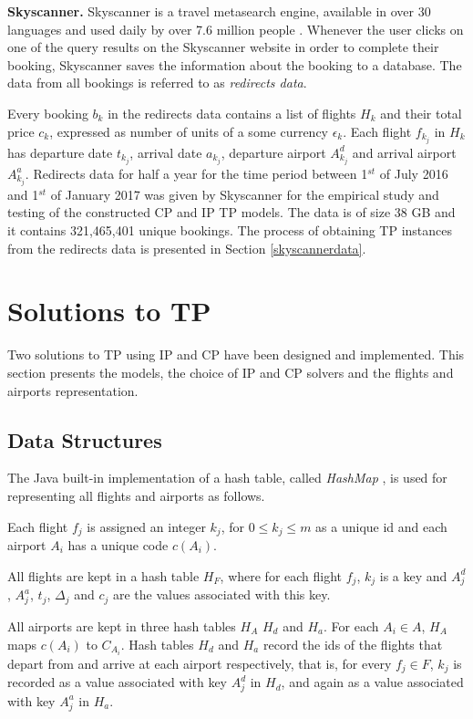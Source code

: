 \documentclass{mpaper}
\begin{document}
\textbf{Skyscanner.} Skyscanner \cite{skyscanner} is a travel metasearch engine, available in over 30 languages and used daily by over 7.6 million people \cite{skyscannerusage}. Whenever the user clicks on one of the query results on the Skyscanner website \cite{skyscanner} in order to complete their booking, Skyscanner saves the information about the booking to a database. The data from all bookings is referred to as \textit{redirects data}.

Every booking $b_k$ in the redirects data contains a list of flights $H_k$ and their total price $c_k$, expressed as number of units of a some currency $\epsilon_k$. Each flight $f_{k_j}$ in $H_k$ has departure date $t_{k_j}$, arrival date $a_{k_j}$, departure airport $A^d_{k_j}$ and arrival airport $A^a_{k_j}$. Redirects data for half a year for the time period between 1$^{st}$ of July 2016 and 1$^{st}$ of January 2017 was given by Skyscanner for the empirical study and testing of the constructed CP and IP TP models. The data is of size 38 GB and it contains 321,465,401 unique bookings. The process of obtaining TP instances from the redirects data is presented in Section \ref{skyscannerdata}.

\section{Solutions to TP}
\label{tpmodels}
Two solutions to TP using IP and CP have been designed and implemented. This section presents the models, the choice of IP and CP solvers and the flights and airports representation.

\subsection{Data Structures}
The Java built-in implementation of a hash table, called \textit{HashMap} \cite{javahashmap}, is used for representing all flights and airports as follows.

Each flight $f_j$ is assigned an integer $k_j$, for $0 \leq k_j \leq m$ as a unique id and each airport $A_i$ has a unique code $c(A_i)$.

All flights are kept in a hash table $H_F$, where for each flight $f_j$, $k_j$ is a key and $A^d_j$, $A^a_j$, $t_j$, $\Delta_j$ and $c_j$ are the values associated with this key.

All airports are kept in three hash tables $H_A$ $H_d$ and $H_a$. For each $A_i \in A$, $H_A$ maps $c(A_i)$ to $C_{A_i}$. Hash tables $H_d$ and $H_a$ record the ids of the flights that depart from and arrive at each airport respectively, that is, for every $f_j \in F$, $k_j$ is recorded as a value associated with key $A^d_j$ in $H_d$, and again as a value associated with key $A^a_j$ in $H_a$.
\end{document}
